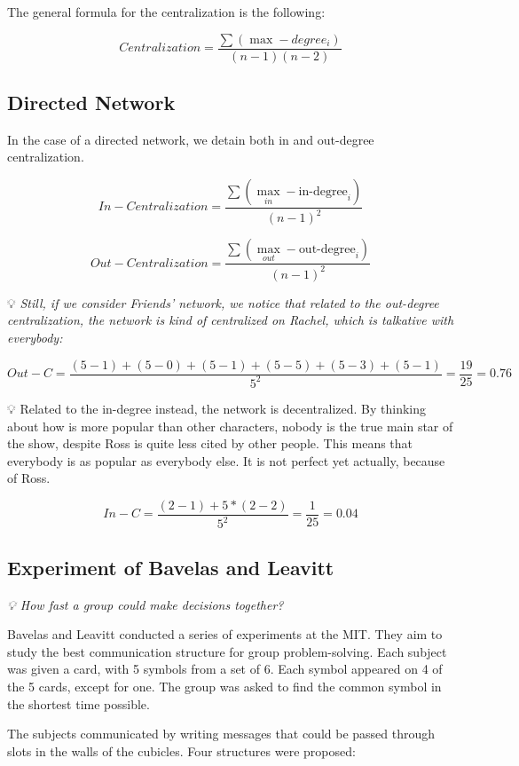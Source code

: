 \documentclass[
  notitlepage,
  onecolumn,
  openany]{book}
\begin{document}
The general formula for the centralization is the following:

\[
Centralization = \frac{\sum (\max-degree_i)}{(n-1)(n-2)}
\]

\hypertarget{directed-network-2}{%
\subsection{Directed Network}\label{directed-network-2}}

In the case of a directed network, we detain both in and out-degree centralization.

\[
In-Centralization = \frac{\sum (\max_{in}-\text{in-degree}_i)}{(n-1)^2}
\]

\[
Out-Centralization = \frac{\sum (\max_{out}-\text{out-degree}_i)}{(n-1)^2}
\]

💡 \emph{Still, if we consider Friends' network, we notice that related to the out-degree centralization, the network is kind of centralized on Rachel, which is talkative with everybody:}

\[
Out-C = \frac{(5-1)+(5-0)+(5-1)+(5-5)+(5-3)+(5-1)}{5^2} = \frac{19}{25} = 0.76
\]

💡 Related to the in-degree instead, the network is decentralized. By thinking about how is more popular than other characters, nobody is the true main star of the show, despite Ross is quite less cited by other people. This means that everybody is as popular as everybody else. It is not perfect yet actually, because of Ross.

\[
In-C = \frac{(2-1)+5*(2-2)}{5^2} = \frac{1}{25} = 0.04
\]

\hypertarget{experiment-of-bavelas-and-leavitt}{%
\subsection{Experiment of Bavelas and Leavitt}\label{experiment-of-bavelas-and-leavitt}}

\emph{💡 How fast a group could make decisions together?}

Bavelas and Leavitt conducted a series of experiments at the MIT. They aim to study the best communication structure for group problem-solving. Each subject was given a card, with 5 symbols from a set of 6. Each symbol appeared on 4 of the 5 cards, except for one. The group was asked to find the common symbol in the shortest time possible.

The subjects communicated by writing messages that could be passed through slots in the walls of the cubicles. Four structures were proposed:
\end{document}
